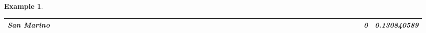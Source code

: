 \documentclass[a4paper,11pt]{report}
\newtheorem{example}[theorem]{Example}
\begin{document}
\begin{example}
\begin{appendices}
\begin{landscape}
\begin{longtable}{r|r|r|r|r|r|r|r|r|r|r|r|r|r|r|r|r|r|r|r|r|r|r|r|r|r|r|r|r|r|r|r|r|r|r|r|r|r|r|r|r|r|r|r|r|r|r|}
\multicolumn{1}{|r|}{\textbf{San Marino}}            &                                       &                                       &                                          &                                       &                                       &                                                     &                                        &                                       &                                      &                                       &                                       &                                                &                                       &                                      &                                       &                                       &                                      &                                       &                                       &                                       &                                      &                                     &                                      &                                         &                                     &                                       &                                          &                                      &                                        &                                       &                                      &                                          &                                      &                                        &                                        &                                     &                                      &                                           &                                               &                                      &                                       &                                              &                                      &                                     & 0                                             & 0.130840589                             \\ \hline

\end{longtable}
\end{landscape}
\end{appendices}
\end{example}
\end{document}
